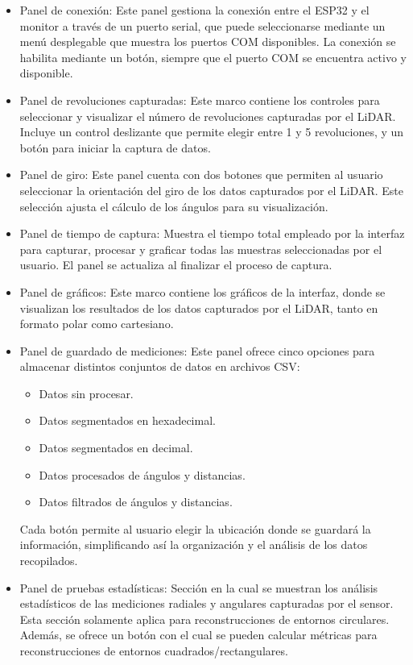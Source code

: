 \begin{itemize}
	\item  Panel de conexión: Este panel gestiona la conexión entre el ESP32 y el monitor a través de un puerto serial, que puede seleccionarse mediante un menú desplegable que muestra los puertos COM disponibles. La conexión se habilita mediante un botón, siempre que el puerto COM se encuentra activo y disponible. 
	\item Panel de revoluciones capturadas: Este marco contiene los controles para seleccionar y visualizar el número de revoluciones capturadas por el LiDAR. Incluye un control deslizante que permite elegir entre 1 y 5 revoluciones, y un botón para iniciar la captura de datos.
	\item Panel de giro: Este panel cuenta con dos botones que permiten al usuario seleccionar la orientación del giro  de los datos capturados por el LiDAR. Este selección ajusta el cálculo de los ángulos para su visualización.
	\item Panel de tiempo de captura: Muestra el tiempo total empleado por la interfaz para capturar, procesar y graficar todas las muestras seleccionadas por el usuario. El panel se actualiza al finalizar el proceso de captura.
	\item Panel de gráficos: Este marco contiene los gráficos de la interfaz, donde se visualizan los resultados de los datos capturados por el LiDAR, tanto en formato polar como cartesiano.
	\item Panel de guardado de mediciones: Este panel ofrece cinco opciones para almacenar distintos conjuntos de datos en archivos CSV:
	\begin{itemize}
		\item Datos sin procesar.
		\item Datos segmentados en hexadecimal.
		\item Datos segmentados en decimal.
		\item Datos procesados de ángulos y distancias.
		\item Datos filtrados de ángulos y distancias. 
	\end{itemize}
	Cada botón permite al usuario elegir la ubicación donde se guardará la información, simplificando así la organización y el análisis de los datos recopilados.
	\item Panel de pruebas estadísticas: Sección en la cual se muestran los análisis estadísticos de las mediciones radiales y angulares capturadas por el sensor. Esta sección solamente aplica para reconstrucciones de entornos circulares. Además, se ofrece un botón con el cual se pueden calcular métricas para reconstrucciones de entornos cuadrados/rectangulares.
\end{itemize}

